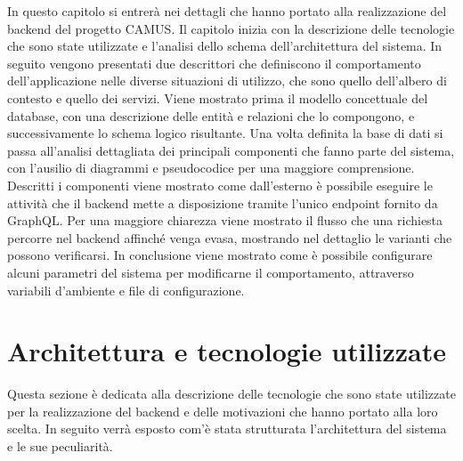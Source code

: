 In questo capitolo si entrerà nei dettagli che hanno portato alla realizzazione del backend del progetto CAMUS. Il capitolo inizia con la descrizione delle tecnologie che sono state utilizzate e l'analisi dello schema dell'architettura del sistema. In seguito vengono presentati due descrittori che definiscono il comportamento dell'applicazione nelle diverse situazioni di utilizzo, che sono quello dell'albero di contesto e quello dei servizi. Viene mostrato prima il modello concettuale del database, con una descrizione delle entità e relazioni che lo compongono, e successivamente lo schema logico risultante. Una volta definita la base di dati si passa all'analisi dettagliata dei principali componenti che fanno parte del sistema, con l'ausilio di diagrammi e pseudocodice per una maggiore comprensione. Descritti i componenti viene mostrato come dall'esterno è possibile eseguire le attività che il backend mette a disposizione tramite l'unico endpoint fornito da GraphQL. Per una maggiore chiarezza viene mostrato il flusso che una richiesta percorre nel backend affinché venga evasa, mostrando nel dettaglio le varianti che possono verificarsi. In conclusione viene mostrato come è possibile configurare alcuni parametri del sistema per modificarne il comportamento, attraverso variabili d'ambiente e file di configurazione.

\section{Architettura e tecnologie utilizzate\label{sec:architettura-backend}}

Questa sezione è dedicata alla descrizione delle tecnologie che sono state utilizzate per la realizzazione del backend e delle motivazioni che hanno portato alla loro scelta. In seguito verrà esposto com'è stata strutturata l'architettura del sistema e le sue peculiarità.

